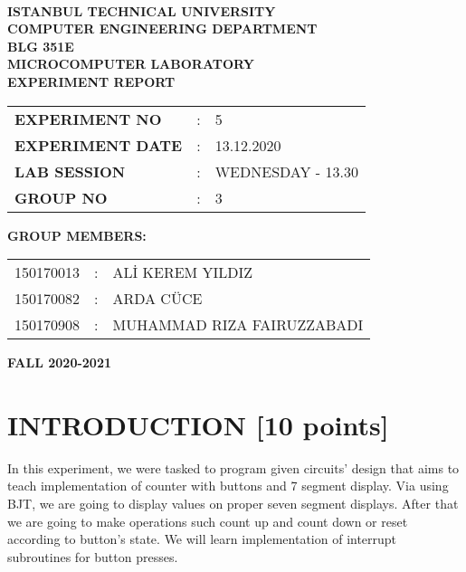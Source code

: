 \documentclass[pdftex,12pt,a4paper]{article}
\begin{document}
\begin{titlepage}
\begin{center}
\textbf{}\\
\textbf{\Large{ISTANBUL TECHNICAL UNIVERSITY}}\\
\vspace{0.5cm}
\textbf{\Large{COMPUTER ENGINEERING DEPARTMENT}}\\
\vspace{2cm}
\textbf{\Large{BLG 351E\\ MICROCOMPUTER LABORATORY\\ EXPERIMENT REPORT}}\\
\vspace{2.8cm}
\begin{table}[ht]
\centering
\Large{
\begin{tabular}{lcl}
\textbf{EXPERIMENT NO}  & : & 5 \\
\textbf{EXPERIMENT DATE}  & : & 13.12.2020 \\
\textbf{LAB SESSION}  & : & WEDNESDAY - 13.30 \\
\textbf{GROUP NO}  & : & 3 \\
\end{tabular}}
\end{table}
\vspace{1cm}
\textbf{\Large{GROUP MEMBERS:}}\\
\begin{table}[ht]
\centering
\Large{
\begin{tabular}{rcl}
150170013  & : & ALİ KEREM YILDIZ \\
150170082  & : & ARDA CÜCE \\
150170908  & : & MUHAMMAD RIZA FAIRUZZABADI \\
\end{tabular}}
\end{table}
\vspace{2.8cm}
\textbf{\Large{FALL 2020-2021}}

\end{center}

\end{titlepage}

\thispagestyle{empty}
\setcounter{tocdepth}{4}
\tableofcontents
\clearpage

\setcounter{page}{1}

\section{INTRODUCTION [10 points]}
In this experiment, we were tasked to program given circuits' design that aims to teach implementation of counter with buttons and 7 segment display. Via using BJT, we are going to display values on proper seven segment displays. After that we are going to make operations such count up and count down or reset according to button's state. We will learn implementation of interrupt subroutines for button presses.
\end{document}
